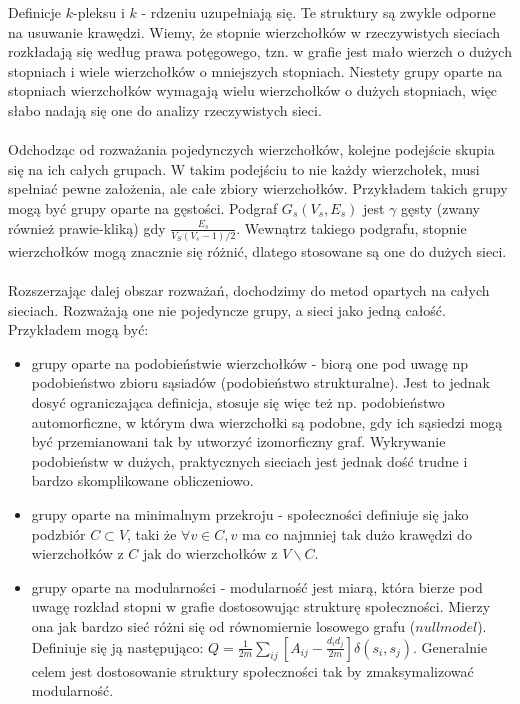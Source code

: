 \documentclass{article}
\begin{document}
Definicje $k$-pleksu i $k$ - rdzeniu uzupełniają się. Te struktury są zwykle odporne na usuwanie krawędzi. Wiemy, że stopnie wierzchołków w rzeczywistych sieciach rozkładają się według prawa potęgowego, tzn. w grafie jest mało wierzch o dużych stopniach i wiele wierzchołków o mniejszych stopniach. Niestety grupy oparte na stopniach wierzchołków wymagają wielu wierzchołków o dużych stopniach, więc słabo nadają się one do analizy rzeczywistych sieci.
\\ \\
Odchodząc od rozważania pojedynczych wierzchołków, kolejne podejście skupia się na ich całych grupach. W takim podejściu to nie każdy wierzchołek, musi spełniać pewne założenia, ale całe zbiory wierzchołków. Przykładem takich grupy mogą być grupy oparte na gęstości. Podgraf $G_s(V_s,E_s)$ jest $\gamma$ gęsty (zwany również prawie-kliką) gdy $\frac{E_s}{V_S(V_s-1)/2}$. Wewnątrz takiego podgrafu, stopnie wierzchołków mogą znacznie się różnić, dlatego stosowane są one do dużych sieci.
\\\\
Rozszerzając dalej obszar rozważań, dochodzimy do metod opartych na całych sieciach. Rozważają one nie pojedyncze grupy, a sieci jako jedną całość. Przykładem mogą być: 
\begin{itemize}
\item grupy oparte na podobieństwie wierzchołków - biorą one pod uwagę np podobieństwo zbioru sąsiadów (podobieństwo strukturalne). Jest to jednak dosyć ograniczająca definicja, stosuje się więc też np. podobieństwo automorficzne, w którym dwa wierzchołki są podobne, gdy ich sąsiedzi mogą być przemianowani tak by utworzyć izomorficzny graf. Wykrywanie podobieństw w dużych, praktycznych sieciach jest jednak dość trudne i bardzo skomplikowane obliczeniowo.
\item grupy oparte na minimalnym przekroju - społeczności definiuje się jako podzbiór $C \subset V$, taki że $\forall v \in C, v$ ma co najmniej tak dużo krawędzi do wierzchołków z $C$ jak do wierzchołków z $V \backslash C$.
\item grupy oparte na modularności - modularność jest miarą, która bierze pod uwagę rozkład stopni w grafie dostosowując strukturę społeczności. Mierzy ona jak bardzo sieć różni się od równomiernie losowego grafu ($null model$). Definiuje się ją następująco: $Q= \frac{1}{2m} \sum\limits_{ij} [A_{ij} - \frac{d_i d_j}{2m}]\delta(s_i,s_j)$. Generalnie celem jest dostosowanie struktury społeczności tak by zmaksymalizować modularność.
\end{itemize}
\end{document}
